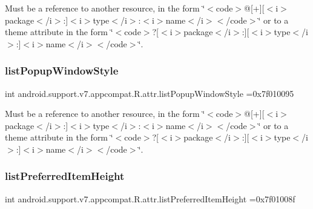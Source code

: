 Must be a reference to another resource, in the form \char`\"{}$<$code$>$@\mbox{[}+\mbox{]}\mbox{[}$<$i$>$package$<$/i$>$\+:\mbox{]}$<$i$>$type$<$/i$>$\+:$<$i$>$name$<$/i$>$$<$/code$>$\char`\"{} or to a theme attribute in the form \char`\"{}$<$code$>$?\mbox{[}$<$i$>$package$<$/i$>$\+:\mbox{]}\mbox{[}$<$i$>$type$<$/i$>$\+:\mbox{]}$<$i$>$name$<$/i$>$$<$/code$>$\char`\"{}. \mbox{\label{classandroid_1_1support_1_1v7_1_1appcompat_1_1R_1_1attr_a6c3e8088ac6dfdc51c06245cf9673ed4}} 
\subsubsection{\texorpdfstring{list\+Popup\+Window\+Style}{listPopupWindowStyle}}
{\footnotesize\ttfamily int android.\+support.\+v7.\+appcompat.\+R.\+attr.\+list\+Popup\+Window\+Style =0x7f010095\hspace{0.3cm}{\ttfamily [static]}}

Must be a reference to another resource, in the form \char`\"{}$<$code$>$@\mbox{[}+\mbox{]}\mbox{[}$<$i$>$package$<$/i$>$\+:\mbox{]}$<$i$>$type$<$/i$>$\+:$<$i$>$name$<$/i$>$$<$/code$>$\char`\"{} or to a theme attribute in the form \char`\"{}$<$code$>$?\mbox{[}$<$i$>$package$<$/i$>$\+:\mbox{]}\mbox{[}$<$i$>$type$<$/i$>$\+:\mbox{]}$<$i$>$name$<$/i$>$$<$/code$>$\char`\"{}. \mbox{\label{classandroid_1_1support_1_1v7_1_1appcompat_1_1R_1_1attr_a054ea1bd82a17a4a8f87815b99a973dd}} 
\subsubsection{\texorpdfstring{list\+Preferred\+Item\+Height}{listPreferredItemHeight}}
{\footnotesize\ttfamily int android.\+support.\+v7.\+appcompat.\+R.\+attr.\+list\+Preferred\+Item\+Height =0x7f01008f\hspace{0.3cm}{\ttfamily [static]}}

